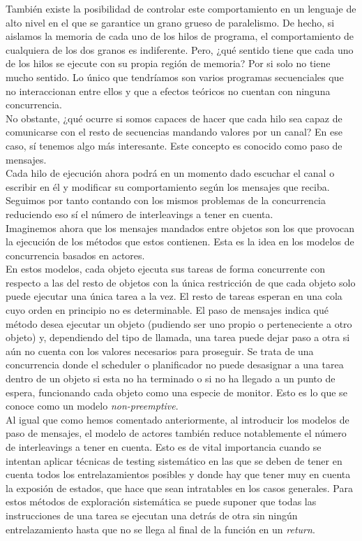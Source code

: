 También existe la posibilidad de controlar este comportamiento en un lenguaje de alto nivel en el que se garantice un grano grueso de paralelismo. De hecho, si aislamos la memoria de cada uno de los hilos de programa, el comportamiento de cualquiera de los dos granos es indiferente. Pero, ¿qué sentido tiene que cada uno de los hilos se ejecute con su propia región de memoria? Por si solo no tiene mucho sentido. Lo único que tendríamos son varios programas secuenciales que no interaccionan entre ellos y que a efectos teóricos no cuentan con ninguna concurrencia.\\

No obstante, ¿qué ocurre si somos capaces de hacer que cada hilo sea capaz de comunicarse con el resto de secuencias mandando valores por un canal? En ese caso, sí tenemos algo más interesante. Este concepto es conocido como paso de mensajes.\\

Cada hilo de ejecución ahora podrá en un momento dado escuchar el canal o escribir en él y modificar su comportamiento según los mensajes que reciba. Seguimos por tanto contando con los mismos problemas de la concurrencia reduciendo eso sí el número de interleavings a tener en cuenta.\\

Imaginemos ahora que los mensajes mandados entre objetos son los que provocan la ejecución de los métodos que estos contienen. Esta es la idea en los modelos de concurrencia basados en actores.\\

En estos modelos, cada objeto ejecuta sus tareas de forma concurrente con respecto a las del resto de objetos con la única restricción de que cada objeto solo puede ejecutar una única tarea a la vez. El resto de tareas esperan en una cola cuyo orden en principio no es determinable. El paso de mensajes indica qué método desea ejecutar un objeto (pudiendo ser uno propio o perteneciente a otro objeto) y, dependiendo del tipo de llamada, una tarea puede dejar paso a otra si aún no cuenta con los valores necesarios para proseguir. Se trata de una concurrencia donde el scheduler o planificador no puede desasignar a una tarea dentro de un objeto si esta no ha terminado o si no ha llegado a un punto de espera, funcionando cada objeto como una especie de monitor. Esto es lo que se conoce como un modelo \emph{non-preemptive}.\\

Al igual que como hemos comentado anteriormente, al introducir los modelos de paso de mensajes, el modelo de actores también reduce notablemente el número de interleavings a tener en cuenta. Esto es de vital importancia cuando se intentan aplicar técnicas de testing sistemático en las que se deben de tener en cuenta todos los entrelazamientos posibles y donde hay que tener muy en cuenta la exposión de estados, que hace que sean intratables en los casos generales. Para estos métodos de exploración sistemática se puede suponer que todas las instrucciones de una tarea se ejecutan una detrás de otra sin ningún entrelazamiento hasta que no se llega al final de la función en un \emph{return}.\\

